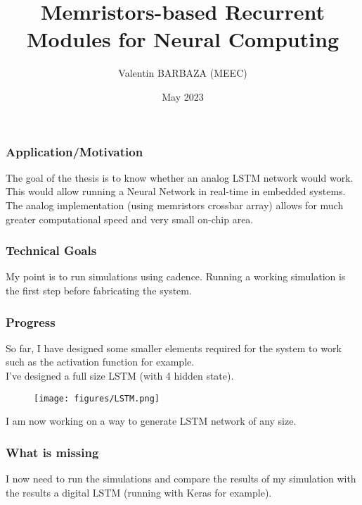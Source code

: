 \documentclass{beamer}
\title[MSc Thesis]
{Memristors-based Recurrent Modules for Neural Computing}
\institute[IST] %
{%
  Diogo Caetano\\
  INESC-MN
  \and%
  Ruxandra Barlulescu\\
  INESC-ID
  }
\author[V. BARBAZA]{Valentin BARBAZA (MEEC)}
\date[2023] %
  {May 2023}
\begin{document}
  \frame{\titlepage}


  \begin{frame}
    \frametitle{Application/Motivation}
    The goal of the thesis is to know whether an analog LSTM network would work. This would allow running a Neural Network in real-time in embedded systems. The analog implementation (using memristors crossbar array) allows for much greater computational speed and very small on-chip area.
  \end{frame}
  \begin{frame}
    \frametitle{Technical Goals}
    My point is to run simulations using cadence. Running a working simulation is the first step before fabricating the system.
  \end{frame}
  \begin{frame}
    \frametitle{Progress}
    So far, I have designed some smaller elements required for the system to work such as the activation function for example.\\
    I've designed a full size LSTM (with 4 hidden state).
    \begin{figure}
      \centering
      \texttt{[image: figures/LSTM.png]}
    \end{figure}
    I am now working on a way to generate LSTM network of any size.
  \end{frame}

  \begin{frame}
    \frametitle{What is missing}
    I now need to run the simulations and compare the results of my simulation with the results a digital LSTM (running with Keras for example).
  \end{frame}

  
\end{document}

